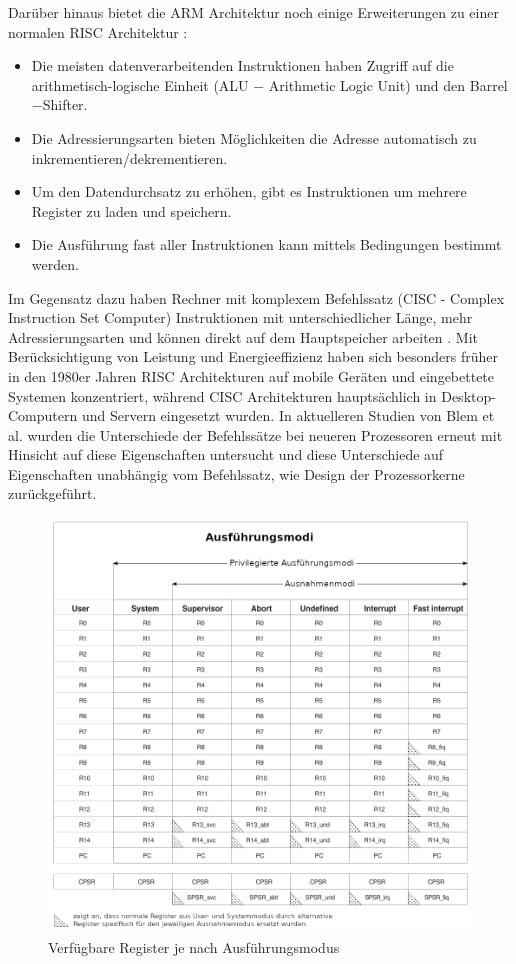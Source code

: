\documentclass[a4paper, 11pt, onecolumn]{article}
\begin{document}
Darüber hinaus bietet die ARM Architektur noch einige Erweiterungen zu einer normalen RISC Architektur \cite{arm:2005}: 

\begin{itemize}
\item Die meisten datenverarbeitenden Instruktionen haben Zugriff auf die arithmetisch-logische Einheit (ALU $-$ Arithmetic Logic Unit) und den Barrel$-$Shifter.
\item Die Adressierungsarten bieten Möglichkeiten die Adresse automatisch zu inkrementieren/dekrementieren.
\item Um den Datendurchsatz zu erhöhen, gibt es Instruktionen um mehrere Register zu laden und speichern. 
\item Die Ausführung fast aller Instruktionen kann mittels Bedingungen bestimmt werden.
\end{itemize}
 
Im Gegensatz dazu haben Rechner mit komplexem Befehlssatz (CISC - Complex Instruction Set Computer) Instruktionen mit unterschiedlicher Länge, mehr Adressierungsarten und können direkt auf dem Hauptspeicher arbeiten \cite{risc}. Mit Berücksichtigung von Leistung und Energieeffizienz haben sich besonders früher in den 1980er Jahren RISC Architekturen auf mobile Geräten und eingebettete Systemen konzentriert, während CISC Architekturen hauptsächlich in Desktop-Computern und Servern eingesetzt wurden. In aktuelleren Studien von Blem et al. \cite{risc} wurden die Unterschiede der Befehlssätze bei neueren Prozessoren erneut mit Hinsicht auf diese Eigenschaften untersucht und diese Unterschiede auf Eigenschaften unabhängig vom Befehlssatz, wie Design der Prozessorkerne zurückgeführt.

\begin{figure}[!htb]
\centering
\includegraphics[width=1\textwidth]{data/registers}
\caption{Verfügbare Register je nach Ausführungsmodus \cite{arm:2005}}
\label{fig:registers}
\end{figure}
\end{document}
